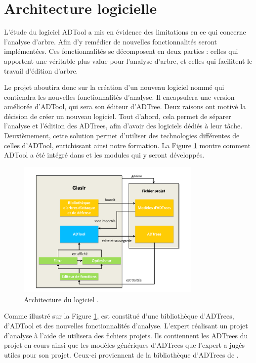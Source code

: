 \section{Architecture logicielle}
	\label{section:archi}



L'étude du logiciel ADTool a mis en évidence des limitations en ce qui concerne l'analyse d'arbre. Afin d'y remédier de nouvelles fonctionnalités seront implémentées. Ces fonctionnalités se décomposent en deux parties : celles qui apportent une véritable plus-value pour l'analyse d'arbre, et celles qui facilitent le travail d'édition d'arbre. 

Le projet aboutira donc sur la création d'un nouveau logiciel nommé \glasir{} qui contiendra les nouvelles fonctionnalités d'analyse. Il encapsulera une version améliorée d'ADTool, qui sera son éditeur d'ADTree. Deux raisons ont motivé la décision de créer un nouveau logiciel. Tout d'abord, cela permet de séparer l'analyse et l'édition des ADTrees, afin d'avoir des logiciels dédiés à leur tâche. Deuxièmement, cette solution permet d'utiliser des technologies différentes de celles d'ADTool, enrichissant ainsi notre formation. La {\sc Figure} \ref{fig:architecture_Glasir} montre comment ADTool a été intégré dans \glasir{} et les modules qui y seront développés. %

	\begin{figure}[h!]
		\centering
			\includegraphics[width=0.8\textwidth]{figure/archiGlasir.pdf}
		\caption{Architecture du logiciel \glasir{}.}
		\label{fig:architecture_Glasir}
	\end{figure}

Comme illustré sur la {\sc Figure} \ref{fig:architecture_Glasir}, \glasir{} est constitué d'une bibliothèque d'ADTrees, d'ADTool et des nouvelles fonctionnalités d'analyse. L'expert réalisant un projet d'analyse à l'aide de \glasir{} utilisera des fichiers projets. Ils contiennent les ADTrees du projet en cours ainsi que les modèles génériques d'ADTrees que l'expert a jugés utiles pour son projet. Ceux-ci proviennent de la bibliothèque d'ADTrees de \glasir{}.
	
